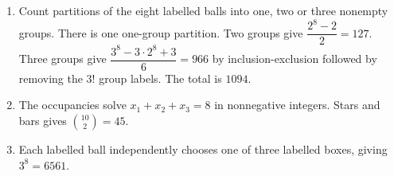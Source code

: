 \begin{enumerate}
\item Count partitions of the eight labelled balls into one, two or three nonempty groups. There is one one-group partition. Two groups give $\dfrac{2^8-2}{2}=127$. Three groups give $\dfrac{3^8-3\cdot2^8+3}{6}=966$ by inclusion-exclusion followed by removing the $3!$ group labels. The total is $\boxed{1094}$.
\item The occupancies solve $x_1+x_2+x_3=8$ in nonnegative integers. Stars and bars gives $\binom{10}{2}=\boxed{45}$.
\item Each labelled ball independently chooses one of three labelled boxes, giving $3^8=\boxed{6561}$.
\end{enumerate}
